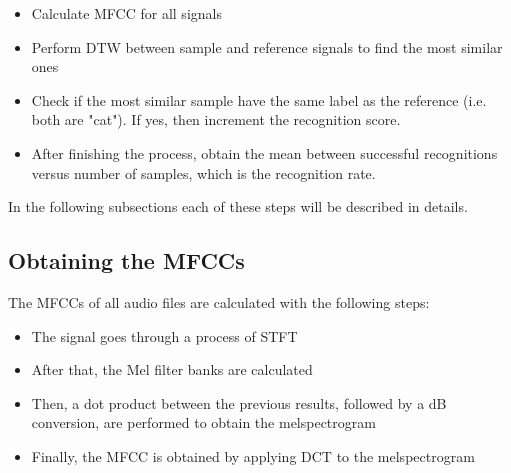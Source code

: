 \documentclass[conference]{IEEEtran}
\begin{document}
\begin{itemize}
    \item Calculate \ac{MFCC} for all signals
    \item Perform \ac{DTW} between sample and reference signals to find the most similar ones
    \item Check if the most similar sample have the same label as the reference (i.e. both are "cat"). 
    If yes, then increment the recognition score. 
    \item After finishing the process, obtain the mean between successful recognitions versus 
    number of samples, which is the recognition rate.
\end{itemize}

In the following subsections each of these steps will be described in details.

\subsection{Obtaining the MFCCs}
 The \acp{MFCC} of all audio files are calculated with the following steps:

\begin{itemize}
    \item The signal goes through a process of \ac{STFT}
    \item After that, the Mel filter banks are calculated
    \item Then, a dot product between the previous results, 
    followed by a dB conversion, are performed to obtain the 
    melspectrogram
    \item Finally, the \ac{MFCC} is obtained by applying \ac{DCT} to the 
    melspectrogram
\end{itemize}
\end{document}
